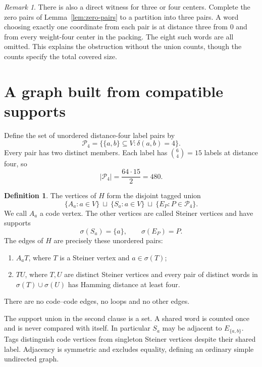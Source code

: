 \documentclass[11pt]{article}
\theoremstyle{definition}
\newtheorem{definition}[theorem]{Definition}
\theoremstyle{remark}
\newtheorem{remark}[theorem]{Remark}
\newcommand{\pairs}{\mathcal P_4}
\begin{document}
\begin{remark}\label{rem:holes}
There is also a direct witness for three or four centers. Complete
the zero pairs of Lemma~\ref{lem:zero-pairs} to a partition into
three pairs. A word choosing exactly one coordinate from each pair
is at distance three from \(0\) and from every weight-four center
in the packing. The eight such words are all omitted.
This explains the obstruction without the union counts, though
the counts specify the total covered size.
\end{remark}

\section{A graph built from compatible supports}\label{sec:construction}
Define the set of unordered distance-four label pairs by
\[
 \pairs=\{\{a,b\}\subseteq V:\delta(a,b)=4\}.
\]
Every pair has two distinct members. Each label has \(\binom64=15\)
labels at distance four, so
\begin{equation}\label{eq:pair-count}
 |\pairs|=\frac{64\cdot15}{2}=480.
\end{equation}

\begin{definition}\label{def:H}
The vertices of \(H\) form the disjoint tagged union
\[
 \{A_a:a\in V\}
 \ \sqcup\ \{S_a:a\in V\}
 \ \sqcup\ \{E_P:P\in\pairs\}.
\]
We call \(A_a\) a code vertex. The other vertices are called Steiner
vertices and have supports
\[
 \sigma(S_a)=\{a\},\qquad \sigma(E_P)=P.
\]
The edges of \(H\) are precisely these unordered pairs:
\begin{enumerate}
\item \(A_aT\), where \(T\) is a Steiner vertex and \(a\in\sigma(T)\);
\item \(TU\), where \(T,U\) are distinct Steiner vertices and every
      pair of distinct words in \(\sigma(T)\cup\sigma(U)\)
      has Hamming distance at least four.
\end{enumerate}
There are no code--code edges, no loops and no other edges.
\end{definition}

The support union in the second clause is a set. A shared word is
counted once and is never compared with itself. In particular \(S_a\)
may be adjacent to \(E_{\{a,b\}}\). Tags distinguish code vertices
from singleton Steiner vertices despite their shared label.
Adjacency is symmetric and excludes equality, defining an ordinary
simple undirected graph.
\end{document}
